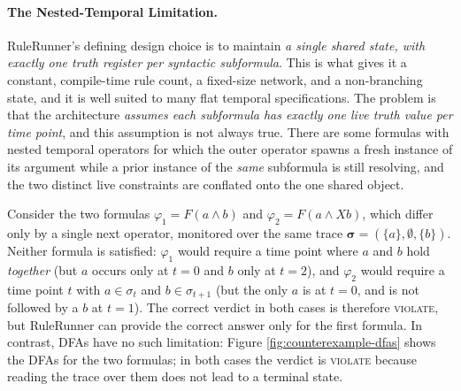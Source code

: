 \paragraph{The Nested-Temporal Limitation.}

RuleRunner's defining design choice is to maintain \emph{a single shared state, with exactly one truth register per syntactic subformula}. This is what gives it a constant, compile-time rule count, a fixed-size network, and a non-branching state, and it is well suited to many flat temporal specifications. The problem is that the architecture \emph{assumes each subformula has exactly one live truth value per time point}, and this assumption is not always true. There are some formulas with nested temporal operators for which the outer operator spawns a fresh instance of its argument while a prior instance of the \emph{same} subformula is still resolving, and the two distinct live constraints are conflated onto the one shared object.

Consider the two formulas $\varphi_1 = F(a \land b)$ and $\varphi_2 = F(a \land Xb)$, which differ only by a single next operator, monitored over the same trace $\boldsymbol{\sigma} = (\{a\}, \emptyset, \{b\})$. Neither formula is satisfied: $\varphi_1$ would require a time point where $a$ and $b$ hold \emph{together} (but $a$ occurs only at $t = 0$ and $b$ only at $t = 2$), and $\varphi_2$ would require a time point $t$ with $a \in \sigma_t$ and $b \in \sigma_{t+1}$ (but the only $a$ is at $t = 0$, and is not followed by a $b$ at $t = 1$). The correct verdict in both cases is therefore \textsc{violate}, but RuleRunner can provide the correct answer only for the first formula. In contrast, DFAs have no such limitation: Figure \ref{fig:counterexample-dfas} shows the DFAs for the two formulas; in both cases the verdict is \textsc{violate} because reading the trace over them does not lead to a terminal state.

